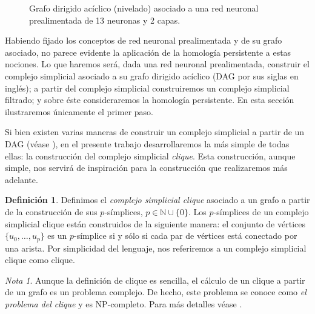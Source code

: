 \documentclass[12pt, a4paper, twoside]{book}
\numberwithin{equation}{section}
\theoremstyle{definition}
\newtheorem{defi}{Definición}[section]
\newenvironment{ejem}
  {\pushQED{\qed}\renewcommand{\qedsymbol}{$\blacktriangleleft$}\ejemplo}
  {\popQED\endejemplo}
\theoremstyle{remark}
\newtheorem*{remark}{Nota}
\theoremstyle{plain}
\begin{document}
\begin{ejem}
\begin{figure}[!htbp]
			\caption{Grafo dirigido acíclico (nivelado) asociado a 
			una red neuronal prealimentada de 13 neuronas y 2 capas.}
			\label{fig:redEjem}
		\end{figure}
	\end{ejem}

	Habiendo fijado los conceptos de red neuronal prealimentada y de su 
	grafo asociado, no parece evidente la aplicación de la homología 
	persistente a estas nociones. Lo que haremos será, dada una red 
	neuronal prealimentada, construir el complejo simplicial asociado a su
	grafo dirigido acíclico (DAG por sus siglas en inglés); a partir del 
	complejo simplicial construiremos un complejo simplicial filtrado; y 
	sobre éste consideraremos la homología persistente. En esta sección
	ilustraremos únicamente el primer paso.

	Si bien existen varias maneras de construir un complejo simplicial a 
	partir de un DAG (véase \cite{Clique-Jakob}), en el presente trabajo 
	desarrollaremos la más simple
	de todas ellas: la construcción del complejo simplicial \emph{clique}. 
	Esta construcción, aunque simple, nos servirá de inspiración para la 
	construcción que realizaremos más adelante. 
	
	\begin{defi}
		Definimos el \textit{complejo simplicial clique} asociado a un
		grafo a partir de la construcción de sus $p$-símplices, $p \in 
		\mathbb{N}\cup\{0\}$. Los $p$-símplices de un complejo 
		simplicial clique están construidos de la siguiente manera: el 
		conjunto de vértices $\{u_{0},\dots,u_{p}\}$ es un 
		$p$-símplice si y sólo si cada par de vértices está conectado 
		por una arista. Por simplicidad del lenguaje, nos referiremos
		a un complejo simplicial clique como clique.
	\end{defi}

	\begin{remark}
		Aunque la definición de clique es sencilla, el cálculo de un 
		clique a partir de un grafo es un problema complejo. De hecho,
		este problema se conoce como \emph{el problema del clique} y 
		es NP-completo. Para más detalles véase \cite{NP-Karp}.
	\end{remark}
\end{document}

